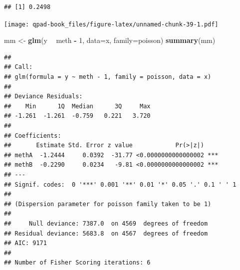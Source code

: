 \documentclass[12pt,]{book}
\newenvironment{Shaded}{\begin{snugshade}}{\end{snugshade}}
\newcommand{\DataTypeTok}[1]{\textcolor[rgb]{0.13,0.29,0.53}{#1}}
\newcommand{\DecValTok}[1]{\textcolor[rgb]{0.00,0.00,0.81}{#1}}
\newcommand{\KeywordTok}[1]{\textcolor[rgb]{0.13,0.29,0.53}{\textbf{#1}}}
\newcommand{\NormalTok}[1]{#1}
\newcommand{\OperatorTok}[1]{\textcolor[rgb]{0.81,0.36,0.00}{\textbf{#1}}}
\newcommand{\OtherTok}[1]{\textcolor[rgb]{0.56,0.35,0.01}{#1}}
\newcommand{\StringTok}[1]{\textcolor[rgb]{0.31,0.60,0.02}{#1}}
\begin{document}
\begin{Shaded}
\end{Shaded}

\begin{verbatim}
## [1] 0.2498
\end{verbatim}

\begin{Shaded}
\end{Shaded}

\texttt{[image: qpad-book\_files/figure-latex/unnamed-chunk-39-1.pdf]}

\begin{Shaded}
\begin{Highlighting}[]
\NormalTok{mm <-}\StringTok{ }\KeywordTok{glm}\NormalTok{(y }\OperatorTok{~}\StringTok{ }\NormalTok{meth }\OperatorTok{-}\StringTok{ }\DecValTok{1}\NormalTok{, }\DataTypeTok{data=}\NormalTok{x, }\DataTypeTok{family=}\NormalTok{poisson)}
\KeywordTok{summary}\NormalTok{(mm)}
\end{Highlighting}
\end{Shaded}

\begin{verbatim}
## 
## Call:
## glm(formula = y ~ meth - 1, family = poisson, data = x)
## 
## Deviance Residuals: 
##    Min      1Q  Median      3Q     Max  
## -1.261  -1.261  -0.759   0.221   3.720  
## 
## Coefficients:
##       Estimate Std. Error z value            Pr(>|z|)    
## methA  -1.2444     0.0392  -31.77 <0.0000000000000002 ***
## methB  -0.2290     0.0234   -9.81 <0.0000000000000002 ***
## ---
## Signif. codes:  0 '***' 0.001 '**' 0.01 '*' 0.05 '.' 0.1 ' ' 1
## 
## (Dispersion parameter for poisson family taken to be 1)
## 
##     Null deviance: 7387.0  on 4569  degrees of freedom
## Residual deviance: 5683.8  on 4567  degrees of freedom
## AIC: 9171
## 
## Number of Fisher Scoring iterations: 6
\end{verbatim}
\end{document}
